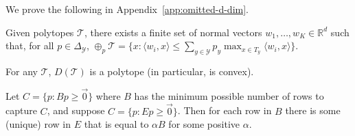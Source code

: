 \documentclass[anon]{colt2020} %
\newcommand{\reals}{\mathbb{R}}
\newcommand{\simplex}{\Delta_\Y}
\newcommand{\T}{\mathcal{T}}
\newcommand{\Y}{\mathcal{Y}}
\newcommand{\inprod}[2]{\langle #1, #2 \rangle}%
\begin{document}
We prove the following in Appendix~\ref{app:omitted-d-dim}.
\begin{lemma}  \label{lemma:minkowski-support}
	Given polytopes $\T$, there exists a finite set of normal vectors $w_1,\ldots,w_K \in \reals^d$ such that, for all $p \in \simplex$, $\oplus_p \T = \{x : \inprod{w_i}{x} \leq \sum_{y \in \Y} p_y \max_{x \in T_y} \inprod{w_i}{x} \}$.
\end{lemma}

\begin{lemma} \label{lemma:D-polytope}
	For any $\T$, $D(\T)$ is a polytope (in particular, is convex).
\end{lemma}

\begin{lemma} \label{lemma:E-to-B}
	Let $C = \{p : Bp \geq \vec 0 \}$ where $B$ has the minimum possible number of rows to capture $C$, and suppose $C = \{p : Ep \geq \vec 0 \}$.
	Then for each row in $B$ there is some (unique) row in $E$ that is equal to $\alpha B$ for some positive $\alpha$.
\end{lemma}
\end{document}
